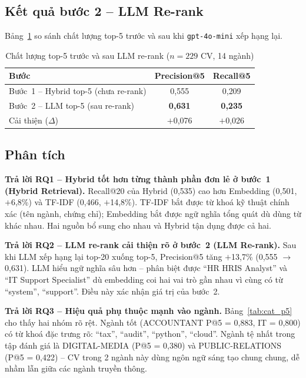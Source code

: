 \documentclass[../DoAn.tex]{subfiles}
\begin{document}
\subsection{Kết quả bước 2 -- LLM Re-rank}
\label{sec:exp_step2}

Bảng~\ref{tab:rag_step2} so sánh chất lượng top-5 trước và sau khi \texttt{gpt-4o-mini} xếp hạng lại.

\begin{table}[H]
\centering
\caption{Chất lượng top-5 trước và sau LLM re-rank ($n=229$ CV, 14 ngành)}
\label{tab:rag_step2}
\begin{tabular}{|l|c|c|}
\hline
\textbf{Bước} & \textbf{Precision@5} & \textbf{Recall@5} \\ \hline
Bước~1 -- Hybrid top-5 (chưa re-rank) & 0{,}555 & 0{,}209 \\ \hline
Bước~2 -- LLM top-5 (sau re-rank)     & \textbf{0{,}631} & \textbf{0{,}235} \\ \hline
Cải thiện ($\Delta$)                   & $+$0{,}076 & $+$0{,}026 \\ \hline
\end{tabular}
\end{table}

\subsection{Phân tích}
\label{sec:exp_analysis}

\textbf{Trả lời RQ1 -- Hybrid tốt hơn từng thành phần đơn lẻ ở bước~1 (Hybrid Retrieval).} Recall@20 của Hybrid (0{,}535) cao hơn Embedding (0{,}501, $+$6{,}8\%) và TF-IDF (0{,}466, $+$14{,}8\%). TF-IDF bắt được từ khoá kỹ thuật chính xác (tên ngành, chứng chỉ); Embedding bắt được ngữ nghĩa tổng quát dù dùng từ khác nhau. Hai nguồn bổ sung cho nhau và Hybrid tận dụng được cả hai.

\textbf{Trả lời RQ2 -- LLM re-rank cải thiện rõ ở bước~2 (LLM Re-rank).} Sau khi LLM xếp hạng lại top-20 xuống top-5, Precision@5 tăng $+$13{,}7\% (0{,}555 $\to$ 0{,}631). LLM hiểu ngữ nghĩa sâu hơn -- phân biệt được ``HR HRIS Analyst'' và ``IT Support Specialist'' dù embedding coi hai vai trò gần nhau vì cùng có từ ``system'', ``support''. Điều này xác nhận giá trị của bước~2.

\textbf{Trả lời RQ3 -- Hiệu quả phụ thuộc mạnh vào ngành.} Bảng~\ref{tab:cat_p5} cho thấy hai nhóm rõ rệt. Ngành tốt (ACCOUNTANT P@5 = 0{,}883, IT = 0{,}800) có từ khoá đặc trưng rõ: ``tax'', ``audit'', ``python'', ``cloud''. Ngành tệ nhất trong tập đánh giá là DIGITAL-MEDIA (P@5 = 0{,}380) và PUBLIC-RELATIONS (P@5 = 0{,}422) -- CV trong 2 ngành này dùng ngôn ngữ sáng tạo chung chung, dễ nhầm lẫn giữa các ngành truyền thông.
\end{document}
